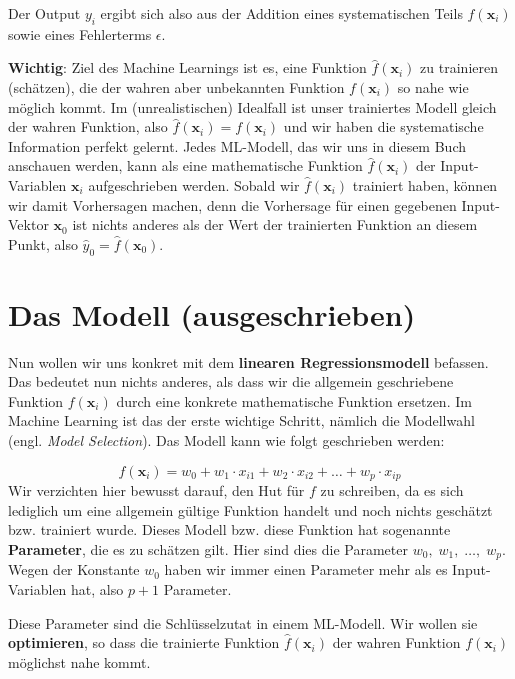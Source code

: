 \documentclass[
]{book}
\begin{document}
Der Output \(y_i\) ergibt sich also aus der Addition eines systematischen Teils \(f(\mathbf{x}_i)\) sowie eines Fehlerterms \(\epsilon\).

\textbf{Wichtig}: Ziel des Machine Learnings ist es, eine Funktion \(\hat{f}(\mathbf{x}_i)\) zu trainieren (schätzen), die der wahren aber unbekannten Funktion \(f(\mathbf{x}_i)\) so nahe wie möglich kommt. Im (unrealistischen) Idealfall ist unser trainiertes Modell gleich der wahren Funktion, also \(\hat{f}(\mathbf{x}_i) = f(\mathbf{x}_i)\) und wir haben die systematische Information perfekt gelernt. Jedes ML-Modell, das wir uns in diesem Buch anschauen werden, kann als eine mathematische Funktion \(\hat{f}(\mathbf{x}_i)\) der Input-Variablen \(\mathbf{x}_i\) aufgeschrieben werden. Sobald wir \(\hat{f}(\mathbf{x}_i)\) trainiert haben, können wir damit Vorhersagen machen, denn die Vorhersage für einen gegebenen Input-Vektor \(\mathbf{x}_0\) ist nichts anderes als der Wert der trainierten Funktion an diesem Punkt, also \(\hat{y}_0 = \hat{f}(\mathbf{x}_0)\).

\hypertarget{das-modell-ausgeschrieben}{%
\section{Das Modell (ausgeschrieben)}\label{das-modell-ausgeschrieben}}

Nun wollen wir uns konkret mit dem \textbf{linearen Regressionsmodell} befassen. Das bedeutet nun nichts anderes, als dass wir die allgemein geschriebene Funktion \(f(\mathbf{x}_i)\) durch eine konkrete mathematische Funktion ersetzen. Im Machine Learning ist das der erste wichtige Schritt, nämlich die Modellwahl (engl. \emph{Model Selection}). Das Modell kann wie folgt geschrieben werden:

\[
f(\mathbf{x}_i) = w_0 + w_1 \cdot x_{i1} + w_2 \cdot x_{i2} + \ldots + w_p \cdot x_{ip}
\]
Wir verzichten hier bewusst darauf, den Hut für \(f\) zu schreiben, da es sich lediglich um eine allgemein gültige Funktion handelt und noch nichts geschätzt bzw. trainiert wurde. Dieses Modell bzw. diese Funktion hat sogenannte \textbf{Parameter}, die es zu schätzen gilt. Hier sind dies die Parameter \(w_0,\; w_1,\; \ldots,\; w_p\). Wegen der Konstante \(w_0\) haben wir immer einen Parameter mehr als es Input-Variablen hat, also \(p+1\) Parameter.

Diese Parameter sind die Schlüsselzutat in einem ML-Modell. Wir wollen sie \textbf{optimieren}, so dass die trainierte Funktion \(\hat{f}(\mathbf{x}_i)\) der wahren Funktion \(f(\mathbf{x}_i)\) möglichst nahe kommt.
\end{document}
